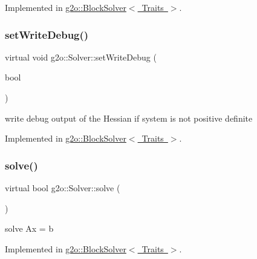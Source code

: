 Implemented in \mbox{\hyperlink{classg2o_1_1_block_solver_a6dd8e7e7a099410005cb96ff874d8866}{g2o\+::\+Block\+Solver$<$ Traits $>$}}.

\mbox{\label{classg2o_1_1_solver_ad3ef2a487d991363ba86af2840b0d7cd}} 
\subsubsection{\texorpdfstring{set\+Write\+Debug()}{setWriteDebug()}}
{\footnotesize\ttfamily virtual void g2o\+::\+Solver\+::set\+Write\+Debug (\begin{DoxyParamCaption}\item[{bool}]{ }\end{DoxyParamCaption})\hspace{0.3cm}{\ttfamily [pure virtual]}}

write debug output of the Hessian if system is not positive definite 

Implemented in \mbox{\hyperlink{classg2o_1_1_block_solver_a1bff5dc13e3408fa76c019347104acd0}{g2o\+::\+Block\+Solver$<$ Traits $>$}}.

\mbox{\label{classg2o_1_1_solver_a9c359a886db57f2f81e54a2113f3bd38}} 
\subsubsection{\texorpdfstring{solve()}{solve()}}
{\footnotesize\ttfamily virtual bool g2o\+::\+Solver\+::solve (\begin{DoxyParamCaption}{ }\end{DoxyParamCaption})\hspace{0.3cm}{\ttfamily [pure virtual]}}

solve Ax = b 

Implemented in \mbox{\hyperlink{classg2o_1_1_block_solver_a589a75a131cce100c1945ad2786214d7}{g2o\+::\+Block\+Solver$<$ Traits $>$}}.

\mbox{\label{classg2o_1_1_solver_a36c68f7bc0b8864ee7722bc3c06de554}} 
